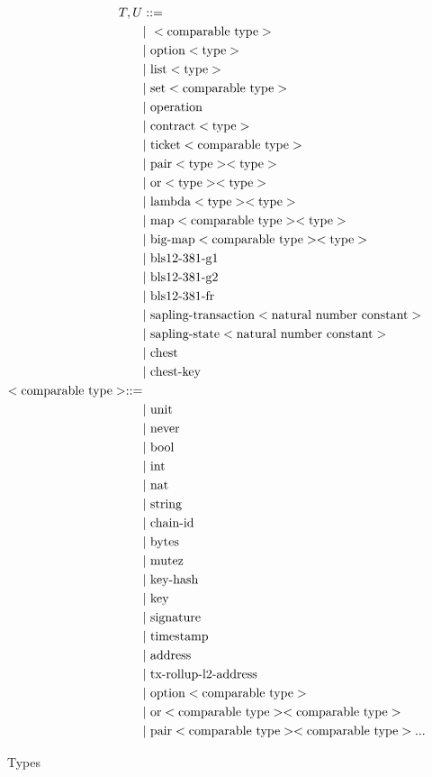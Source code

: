 \documentclass[runningheads]{llncs}
\begin{document}
\begin{figure}
\begin{align*}
T, U &::= \\
   &\text{$\mid$}\ < \text{comparable type}> \\
   &\text{$\mid$}\ \text{option} <\text{type}> \\
   &\text{$\mid$}\ \text{list} <\text{type}> \\
   &\text{$\mid$}\ \text{set} <\text{comparable type}> \\
   &\text{$\mid$}\ \text{operation} \\
   &\text{$\mid$}\ \text{contract} <\text{type}> \\
   &\text{$\mid$}\ \text{ticket} <\text{comparable type}> \\
   &\text{$\mid$}\ \text{pair} <\text{type}> <\text{type}> \\
   &\text{$\mid$}\ \text{or} <\text{type}> <\text{type}> \\
   &\text{$\mid$}\ \text{lambda} <\text{type}> <\text{type}> \\
   &\text{$\mid$}\ \text{map} <\text{comparable type}> <\text{type}> \\
   &\text{$\mid$}\ \text{big-map} <\text{comparable type}> <\text{type}> \\
   &\text{$\mid$}\ \text{bls12-381-g1} \\
   &\text{$\mid$}\ \text{bls12-381-g2} \\
   &\text{$\mid$}\ \text{bls12-381-fr} \\
   &\text{$\mid$}\ \text{sapling-transaction} <\text{natural number constant}> \\
   &\text{$\mid$}\ \text{sapling-state} <\text{natural number constant}> \\
   &\text{$\mid$}\ \text{chest} \\
   &\text{$\mid$}\ \text{chest-key} \\
<\text{comparable type}> ::= \\
   &\text{$\mid$}\ \text{unit} \\
   &\text{$\mid$}\ \text{never} \\
   &\text{$\mid$}\ \text{bool} \\
   &\text{$\mid$}\ \text{int}\\
   &\text{$\mid$}\ \text{nat}\\
   &\text{$\mid$}\ \text{string}\\
   &\text{$\mid$}\ \text{chain-id}\\
   &\text{$\mid$}\ \text{bytes}\\
   &\text{$\mid$}\ \text{mutez}\\
   &\text{$\mid$}\ \text{key-hash}\\
   &\text{$\mid$}\ \text{key}\\
   &\text{$\mid$}\ \text{signature}\\
   &\text{$\mid$}\ \text{timestamp}\\
   &\text{$\mid$}\ \text{address}\\
   &\text{$\mid$}\ \text{tx-rollup-l2-address}\\
   &\text{$\mid$}\ \text{option} <\text{comparable type}>\\
   &\text{$\mid$}\ \text{or} <\text{comparable type}> <\text{comparable type}>\\
   &\text{$\mid$}\ \text{pair} <\text{comparable type}> <\text{comparable type}> \text{$...$} \\
\end{align*}
\caption{Types}
\label{fig:type}
\end{figure}
\end{document}
